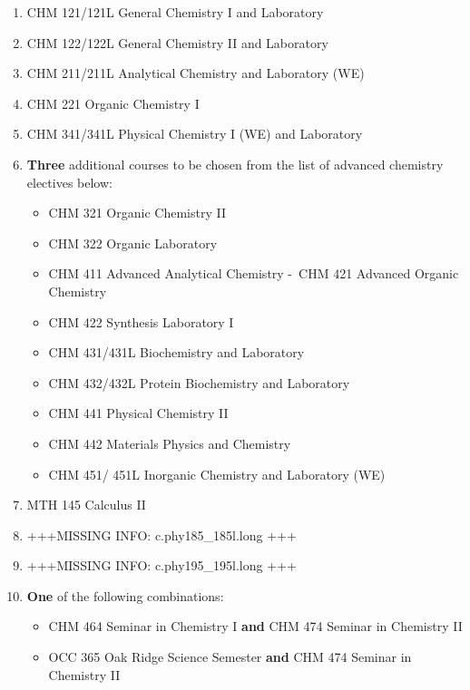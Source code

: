 \documentclass[
  letterpaper,
]{scrbook}
\providecommand{\tightlist}{%
  \setlength{\itemsep}{0pt}\setlength{\parskip}{0pt}}
\begin{document}
\begin{enumerate}
\def\labelenumi{\arabic{enumi}.}
\item
  CHM 121/121L General Chemistry I and Laboratory
\item
  CHM 122/122L General Chemistry II and Laboratory
\item
  CHM 211/211L Analytical Chemistry and Laboratory (WE)
\item
  CHM 221 Organic Chemistry I
\item
  CHM 341/341L Physical Chemistry I (WE) and Laboratory
\item
  \textbf{Three} additional courses to be chosen from the list of
  advanced chemistry electives below:

  \begin{itemize}
  \tightlist
  \item
    CHM 321 Organic Chemistry II
  \item
    CHM 322 Organic Laboratory
  \item
    CHM 411 Advanced Analytical Chemistry -~CHM 421 Advanced Organic
    Chemistry
  \item
    CHM 422 Synthesis Laboratory I
  \item
    CHM 431/431L Biochemistry and Laboratory
  \item
    CHM 432/432L Protein Biochemistry and Laboratory
  \item
    CHM 441 Physical Chemistry II
  \item
    CHM 442 Materials Physics and Chemistry
  \item
    CHM 451/ 451L Inorganic Chemistry and Laboratory (WE)
  \end{itemize}
\item
  MTH 145 Calculus II
\item
  +++MISSING INFO: c.phy185\_185l.long +++
\item
  +++MISSING INFO: c.phy195\_195l.long +++
\item
  \textbf{One} of the following combinations:

  \begin{itemize}
  \tightlist
  \item
    CHM 464 Seminar in Chemistry I \textbf{and} CHM 474 Seminar in
    Chemistry II
  \item
    OCC 365 Oak Ridge Science Semester \textbf{and} CHM 474 Seminar in
    Chemistry II
  \end{itemize}
\end{enumerate}
\end{document}
